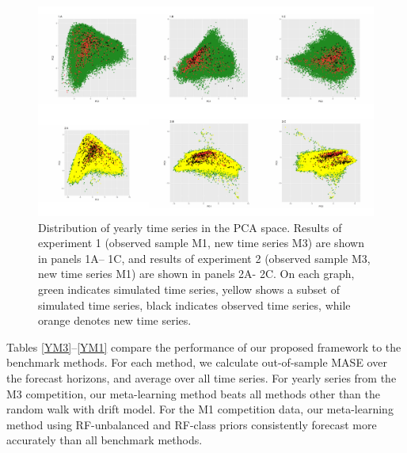 \documentclass[11pt,a4paper,]{article}
\theoremstyle{definition}
\theoremstyle{definition}
\theoremstyle{definition}
\theoremstyle{remark}
\begin{document}
\begin{figure}

{\centering \includegraphics[width=\textwidth]{figure/pca1-1} 

}

\caption{Distribution of yearly time series in the PCA space. Results of experiment 1 (observed sample M1, new time series M3) are shown in panels 1A-- 1C, and results of experiment 2 (observed sample M3, new time series M1) are shown in panels 2A- 2C. On each graph, green indicates simulated time series, yellow shows a subset of simulated time series, black indicates observed time series, while orange denotes new time series.}\label{fig:pca1}
\end{figure}

Tables \ref{YM3}--\ref{YM1} compare the performance of our proposed
framework to the benchmark methods. For each method, we calculate
out-of-sample MASE over the forecast horizons, and average over all time
series. For yearly series from the M3 competition, our meta-learning
method beats all methods other than the random walk with drift model.
For the M1 competition data, our meta-learning method using
RF-unbalanced and RF-class priors consistently forecast more accurately
than all benchmark methods.
\end{document}
